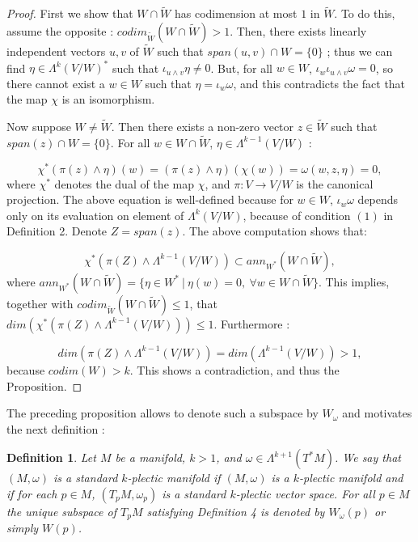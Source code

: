\documentclass[a4paper,12pt,leqno]{article}
\newtheorem{defa}{Definition}
\begin{document}
\begin{proof}
First we show that $W\cap \widetilde{W}$ has codimension at most $1$ in $\widetilde{W}$. To do this, assume the opposite : $codim_{\widetilde{W}}(W\cap\widetilde{W})>1$. Then, there exists linearly independent vectors $u,v$ of $\widetilde{W}$ such that $span(u,v)\cap W=\{0\}$ ; thus we can find $\eta\in \Lambda^k(V/W)^*$ such that $\iota_{u\wedge v}\eta\ne0$. But, for all $w\in W$, $\iota_{w}\iota_{u\wedge v}\omega=0$, so there cannot exist a $w\in W$ such that $\eta=\iota_w\omega$, and this contradicts the fact that the map $\chi$ is an isomorphism. 

Now suppose $W\ne \widetilde{W}$. Then there exists a non-zero vector $z\in \widetilde{W}$ such that $span(z)\cap W=\{0\}$. For all $w\in W\cap\widetilde{W}$, $\eta\in \Lambda^{k-1} (V/W)$ :

\begin{equation*}
\chi^*(\pi(z)\wedge \eta)(w)=(\pi(z)\wedge\eta)(\chi(w))=\omega(w,z,\eta)=0,
\end{equation*}
where $\chi^*$ denotes the dual of the map $\chi$, and $\pi:V\rightarrow V/W$ is the canonical projection. The above equation is well-defined because for $w\in W$, $\iota_w\omega$ depends only on its evaluation on element of $\Lambda^{k} (V/W)$, because of condition $(1)$ in Definition 2. Denote $Z=span(z)$. The above computation shows that:

\begin{equation*}
\chi^*(\pi(Z)\wedge\Lambda^{k-1}(V/W))\subset ann_{W^*}(W\cap\widetilde{W}),
\end{equation*}
where $ann_{W^*}(W\cap\widetilde{W})=\{\eta\in W^* \ | \ \eta(w)=0, \ \forall w\in W\cap\widetilde{W}\}$. This implies, together with $ codim_{\widetilde{W}}(W\cap\widetilde{W})\leq1$, that $dim(\chi^*(\pi(Z)\wedge\Lambda^{k-1}(V/W)))\leq 1$. Furthermore :

\begin{equation*}
dim(\pi(Z)\wedge\Lambda^{k-1}(V/W))=dim(\Lambda^{k-1}(V/W))>1,
\end{equation*}
because $codim(W)>k$. This shows a contradiction, and thus the Proposition. 

\end{proof}

The preceding proposition allows to denote such a subspace by $W_{\omega}$ and motivates the next definition :

\begin{defa}
Let $M$ be a manifold, $k>1$,  and $\omega\in\Lambda^{k+1}(T^*M)$. We say that $(M,\omega)$ is a standard $k$-plectic manifold 
if $(M,\omega)$ is a $k$-plectic manifold and if for each $p\in M$, $(T_pM,\omega_p)$ is a standard $k$-plectic vector space. For all 
$p\in M$ the unique subspace   of $T_pM$ satisfying Definition 4 is denoted by $W_{\omega}(p)$ or simply $W(p)$.
\end{defa}
\end{document}
